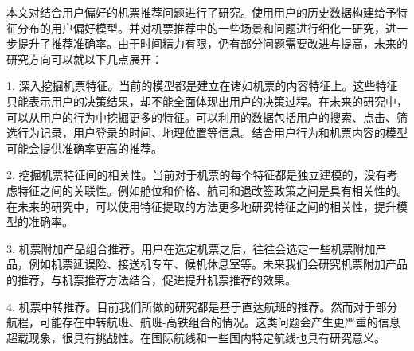 本文对结合用户偏好的机票推荐问题进行了研究。使用用户的历史数据构建给予特征分布的用户偏好模型。并对机票推荐中的一些场景和问题进行细化一研究，进一步提升了推荐准确率。由于时间精力有限，仍有部分问题需要改进与提高，未来的研究方向可以就以下几点展开：

1. 深入挖掘机票特征。当前的模型都是建立在诸如机票的内容特征上。这些特征只能表示用户的决策结果，却不能全面体现出用户的决策过程。在未来的研究中，可以从用户的行为中挖掘更多的特征。可以利用的数据包括用户的搜索、点击、筛选行为记录，用户登录的时间、地理位置等信息。结合用户行为和机票内容的模型可能会提供准确率更高的推荐。

2. 挖掘机票特征间的相关性。当前对于机票的每个特征都是独立建模的，没有考虑特征之间的关联性。例如舱位和价格、航司和退改签政策之间是具有相关性的。在未来的研究中，可以使用特征提取的方法更多地研究特征之间的相关性，提升模型的准确率。

3. 机票附加产品组合推荐。用户在选定机票之后，往往会选定一些机票附加产品，例如机票延误险、接送机专车、候机休息室等。未来我们会研究机票附加产品的推荐，与机票推荐方法结合，促进提升机票推荐的效果。

4. 机票中转推荐。目前我们所做的研究都是基于直达航班的推荐。然而对于部分航程，可能存在中转航班、航班-高铁组合的情况。这类问题会产生更严重的信息超载现象，很具有挑战性。在国际航线和一些国内特定航线也具有研究意义。
